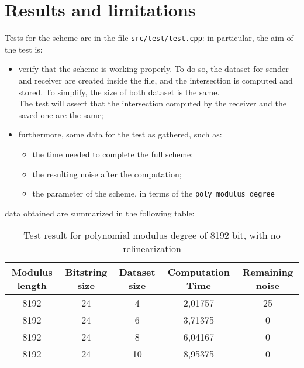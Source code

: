 \documentclass[10pt]{extarticle}
\begin{document}
\section{Results and limitations}
Tests for the scheme are in the file \texttt{src/test/test.cpp}: in particular, the aim of the test is:
\begin{itemize}
    \item verify that the scheme is working properly. To do so, the dataset for sender and receiver are created inside the file, and the intersection is computed and stored. To simplify, the size of both dataset is the same.\\The test will assert that the intersection computed by the receiver and the saved one are the same;
    \item furthermore, some data for the test as gathered, such as:
        \begin{itemize}
            \item the time needed to complete the full scheme;
            \item the resulting noise after the computation;
            \item the parameter of the scheme, in terms of the \texttt{poly\_modulus\_degree} 
        \end{itemize}
\end{itemize}
data obtained are summarized in the following table:\\
\begin{table}[!ht]
	\begin{tabular}{||c|c|c|c|c||}
		\hline
		Modulus length & Bitstring size	& Dataset size	& Computation Time	& Remaining noise\\
		\hline\hline
		8192 & 24 & 4 & 2,01757 & 25\\
		\hline
		8192 & 24 & 6 & 3,71375 & 0\\
		\hline
		8192 & 24 & 8 & 6,04167 & 0\\
		\hline
		8192 & 24 & 10 & 8,95375 & 0\\
		\hline
	\end{tabular}
	\caption{Test result for polynomial modulus degree of 8192 bit, with no relinearization}
\end{table}
\end{document}
